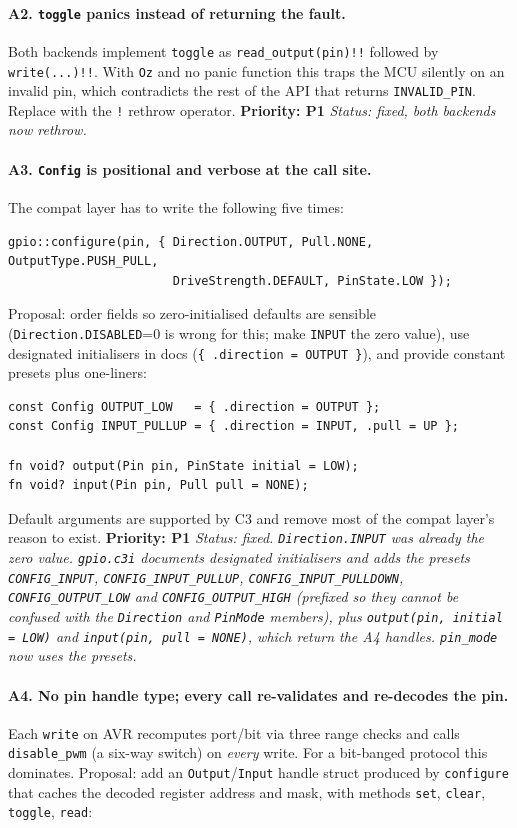 \documentclass[11pt,a4paper]{article}
\newcommand{\pkg}[1]{\texttt{#1}}
\newcommand{\prio}[1]{\textbf{Priority: #1}}
\begin{document}
\paragraph{A2. \pkg{toggle} panics instead of returning the fault.}
Both backends implement \pkg{toggle} as \pkg{read\_output(pin)!!} followed by \pkg{write(...)!!}.
With \pkg{Oz} and no panic function this traps the MCU silently on an invalid pin, which contradicts
the rest of the API that returns \pkg{INVALID\_PIN}. Replace with the \pkg{!} rethrow operator. \prio{P1}
\textit{Status: fixed, both backends now rethrow.}

\paragraph{A3. \pkg{Config} is positional and verbose at the call site.}
The compat layer has to write the following five times:

\begin{lstlisting}[language=C3]
gpio::configure(pin, { Direction.OUTPUT, Pull.NONE, OutputType.PUSH_PULL,
                       DriveStrength.DEFAULT, PinState.LOW });
\end{lstlisting}
\noindent Proposal: order fields so zero-initialised
defaults are sensible (\pkg{Direction.DISABLED}=0 is wrong for this; make \pkg{INPUT} the zero
value), use designated initialisers in docs (\pkg{\{ .direction = OUTPUT \}}), and provide
constant presets plus one-liners:

\begin{lstlisting}[language=C3]
const Config OUTPUT_LOW   = { .direction = OUTPUT };
const Config INPUT_PULLUP = { .direction = INPUT, .pull = UP };

fn void? output(Pin pin, PinState initial = LOW);
fn void? input(Pin pin, Pull pull = NONE);
\end{lstlisting}
Default arguments are supported by C3 and remove most of the compat layer's reason to exist.
\prio{P1}
\textit{Status: fixed. \pkg{Direction.INPUT} was already the zero value. \pkg{gpio.c3i} documents designated initialisers and adds the presets \pkg{CONFIG\_INPUT}, \pkg{CONFIG\_INPUT\_PULLUP}, \pkg{CONFIG\_INPUT\_PULLDOWN}, \pkg{CONFIG\_OUTPUT\_LOW} and \pkg{CONFIG\_OUTPUT\_HIGH} (prefixed so they cannot be confused with the \pkg{Direction} and \pkg{PinMode} members), plus \pkg{output(pin, initial = LOW)} and \pkg{input(pin, pull = NONE)}, which return the A4 handles. \pkg{pin\_mode} now uses the presets.}

\paragraph{A4. No pin handle type; every call re-validates and re-decodes the pin.}
Each \pkg{write} on AVR recomputes port/bit via three range checks and calls \pkg{disable\_pwm}
(a six-way switch) on \emph{every} write. For a bit-banged protocol this dominates. Proposal:
add an \pkg{Output}/\pkg{Input} handle struct produced by \pkg{configure} that caches the decoded
register address and mask, with methods \pkg{set}, \pkg{clear}, \pkg{toggle}, \pkg{read}:
\end{document}
